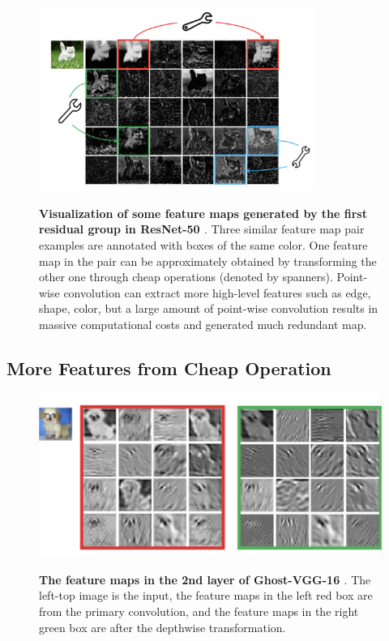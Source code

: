 \begin{figure}[t]
\begin{center}
\centering
\includegraphics[width=0.8\textwidth]{thesis-template-master/images/ghostpointwise.png}
\label{fig:cellnet}
\end{center}
\caption{\textbf{Visualization of some feature maps generated by the first residual group in ResNet-50 \cite{19}}.  Three similar feature map pair examples are annotated with boxes of the same color. One feature map in the pair can be approximately obtained by transforming the other one through cheap operations (denoted by spanners). Point-wise convolution can extract more high-level features such as edge, shape, color, but a large amount of point-wise convolution results in massive computational costs  and generated much redundant map.}
\end{figure}


\subsection{ More Features from Cheap Operation}


\begin{figure}[t]
\begin{center}
\centering
\includegraphics[width=\textwidth]{thesis-template-master/images/ghostgener.png}
\label{fig:cellnet}
\end{center}
\caption{\textbf{The feature maps in the 2nd layer of Ghost-VGG-16  \cite{19}}.  The left-top image is the input, the feature maps in the left red box are from the primary convolution, and the feature maps in the right green box are after the depthwise transformation.}
\end{figure}


